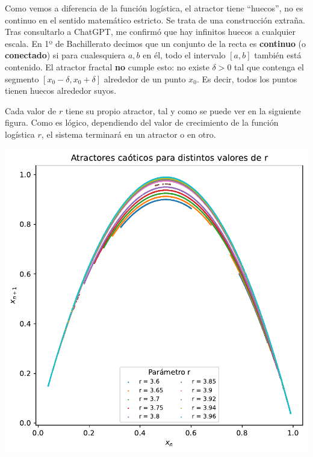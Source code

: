 \documentclass[
  10pt,
  a4paper,
  DIV=11,
  numbers=noendperiod,
  open=any]{scrreprt}
\makeatletter
\newcommand*\pandocbounded[1]{%
  \sbox\pandoc@box{#1}%
  \Gscale@div\@tempa{\textheight}{\dimexpr\ht\pandoc@box+\dp\pandoc@box\relax}%
  \Gscale@div\@tempb{\linewidth}{\wd\pandoc@box}%
  \ifdim\@tempb\p@<\@tempa\p@\let\@tempa\@tempb\fi%
  \ifdim\@tempa\p@<\p@\scalebox{\@tempa}{\usebox\pandoc@box}%
  \else\usebox{\pandoc@box}%
  \fi%
}
\numberwithin{equation}{chapter}
\numberwithin{equation}{section}
\renewcommand{\[}{\begin{equation}}
\renewcommand{\]}{\end{equation}}
\providecommand{\pandocbounded}[1]{#1}%
\renewcommand{\pandocbounded}[1]{\begingroup\centering #1\par\endgroup}
\makeatother
\begin{document}
Como vemos a diferencia de la función logística, el atractor tiene
``huecos'', no es continuo en el sentido matemático estricto. Se trata
de una construcción extraña. Tras consultarlo a ChatGPT, me confirmó que
hay infinitos huecos a cualquier escala. En 1º de Bachillerato decimos
que un conjunto de la recta es \textbf{continuo} (o \textbf{conectado})
si para cualesquiera \(a,b\) en él, todo el intervalo \([a,b]\) también
está contenido. El atractor fractal \textbf{no} cumple esto: no existe
\(\delta>0\) tal que contenga el segmento \([x_0-\delta, x_0+\delta]\)
alrededor de un punto \(x_0\). Es decir, todos los puntos tienen huecos
alrededor suyos.

Cada valor de \(r\) tiene su propio atractor, tal y como se puede ver en
la siguiente figura. Como es lógico, dependiendo del valor de
crecimiento de la función logística \(r\), el sistema terminará en un
atractor o en otro.

\pandocbounded{\includegraphics[keepaspectratio]{04-clima/atractor_files/figure-pdf/cell-7-output-1.pdf}}
\end{document}
